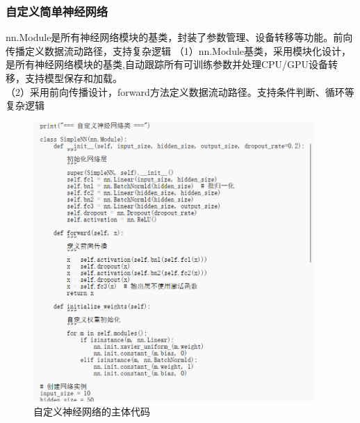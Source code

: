 \documentclass[UTF8]{ctexart}
\begin{document}
\subsubsection{自定义简单神经网络}
nn.Module是所有神经网络模块的基类，封装了参数管理、设备转移等功能。前向传播定义数据流动路径，支持复杂逻辑
（1）nn.Module基类，采用模块化设计，是所有神经网络模块的基类,自动跟踪所有可训练参数并处理CPU/GPU设备转移，支持模型保存和加载。\\
（2）采用前向传播设计，forward方法定义数据流动路径。支持条件判断、循环等复杂逻辑\\
\begin{figure}[H]
    \centering
    \includegraphics[width=0.95\textwidth]{picture/自定义神经网络代码.png}%
    \caption{自定义神经网络的主体代码}
\end{figure}
\end{document}
